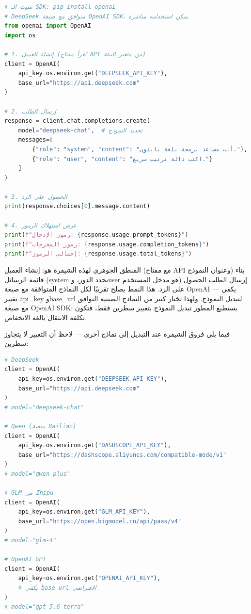 \begin{lstlisting}[language=Python]
# تثبيت الـ SDK: pip install openai
# DeepSeek متوافق مع صيغة OpenAI SDK، يمكن استخدامه مباشرة
from openai import OpenAI
import os

# 1. إنشاء العميل (يُقرأ مفتاح API من متغير البيئة)
client = OpenAI(
    api_key=os.environ.get("DEEPSEEK_API_KEY"),
    base_url="https://api.deepseek.com"
)

# 2. إرسال الطلب
response = client.chat.completions.create(
    model="deepseek-chat",  # تحديد النموذج
    messages=[
        {"role": "system", "content": "أنت مساعد برمجة بلغة بايثون."},
        {"role": "user", "content": "اكتب دالة ترتيب سريع."}
    ]
)

# 3. الحصول على الرد
print(response.choices[0].message.content)

# 4. عرض استهلاك الرموز
print(f"رموز الإدخال: {response.usage.prompt_tokens}")
print(f"رموز المخرجات: {response.usage.completion_tokens}")
print(f"إجمالي الرموز: {response.usage.total_tokens}")
\end{lstlisting}

المنطق الجوهري لهذه الشيفرة هو: إنشاء العميل (مع مفتاح API وعنوان النموذج) بناء قائمة الرسائل (system يحدد الدور، وuser هو مدخل المستخدم) إرسال الطلب الحصول على الرد. هذا النمط يصلح تقريبًا لكل النماذج المتوافقة مع صيغة OpenAI — يكفي تغيير api\_key وbase\_url لتبديل النموذج. ولهذا تختار كثير من النماذج الصينية التوافق مع صيغة OpenAI SDK: يستطيع المطور تبديل النموذج بتغيير سطرين فقط، فتكون تكلفة الانتقال بالغة الانخفاض.

فيما يلي فروق الشيفرة عند التبديل إلى نماذج أخرى — لاحظ أن التغيير لا يتجاوز سطرين:

\begin{lstlisting}[language=Python]
# DeepSeek
client = OpenAI(
    api_key=os.environ.get("DEEPSEEK_API_KEY"),
    base_url="https://api.deepseek.com"
)
# model="deepseek-chat"

# Qwen (منصة Bailian)
client = OpenAI(
    api_key=os.environ.get("DASHSCOPE_API_KEY"),
    base_url="https://dashscope.aliyuncs.com/compatible-mode/v1"
)
# model="qwen-plus"

# GLM من Zhipu
client = OpenAI(
    api_key=os.environ.get("GLM_API_KEY"),
    base_url="https://open.bigmodel.cn/api/paas/v4"
)
# model="glm-4"

# OpenAI GPT
client = OpenAI(
    api_key=os.environ.get("OPENAI_API_KEY"),
    # يكفي base_url الافتراضي
)
# model="gpt-5.6-terra"
\end{lstlisting}

